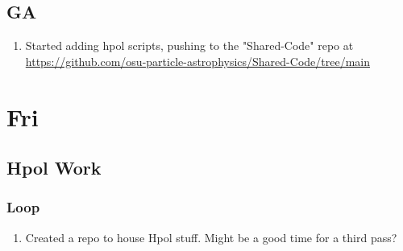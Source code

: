 \documentclass[12pt,letterpaper]{article}
\begin{document}
\subsection{GA}
\begin{enumerate}
  \item Started adding hpol scripts, pushing to the "Shared-Code" repo at
    \url{https://github.com/osu-particle-astrophysics/Shared-Code/tree/main}
\end{enumerate}

\section{Fri}
\subsection{Hpol Work}
\subsubsection{Loop}
\begin{enumerate}
  \item Created a repo to house Hpol stuff. Might be a good time for a third pass?
\end{enumerate}
\end{document}
